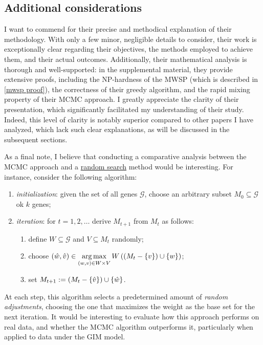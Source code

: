 \subsection{Additional considerations}

I want to commend \textcite{dendrix} for their precise and methodical explanation of their methodology. With only a few minor, negligible details to consider, their work is exceptionally clear regarding their objectives, the methods employed to achieve them, and their actual outcomes. Additionally, their mathematical analysis is thorough and well-supported: in the supplemental material, they provide extensive proofs, including the NP-hardness of the MWSP (which is described in \cref{mwsp proof}), the correctness of their greedy algorithm, and the rapid mixing property of their MCMC approach. I greatly appreciate the clarity of their presentation, which significantly facilitated my understanding of their study. Indeed, this level of clarity is notably superior compared to other papers I have analyzed, which lack such clear explanations, as will be discussed in the subsequent sections.

As a final note, I believe that conducting a comparative analysis between the MCMC approach and a \href{https://en.wikipedia.org/wiki/Random_search}{random search} method would be interesting. For instance, consider the following algorithm:

\begin{enumerate}
    \item \textit{initialization}: given the set of all genes $\mathcal G$, choose an arbitrary subset $M_0 \subseteq \mathcal G$ ok $k$ genes;
    \item \textit{iteration}: for $t = 1, 2, \ldots$ derive $M_{t + 1}$ from $M_t$ as follows:

    \begin{enumerate}
        \item define $W \subseteq \mathcal G$ and $V \subseteq M_t$ randomly;
        \item choose $\displaystyle (\hat w, \hat v) \in \operatorname*{arg\,max}_{(w, v) \in W \times V}{W\left(\left(M_t - \{v\}\right) \cup \{w\}\right)}$;
        \item set $M_{t + 1} := \left(M_t - \{\hat v\}\right) \cup \{\hat w\}$.
    \end{enumerate}
\end{enumerate}

At each step, this algorithm selects a predetermined amount of \textit{random adjustments}, choosing the one that maximizes the weight as the base set for the next iteration. It would be interesting to evaluate how this approach performs on real data, and whether the MCMC algorithm outperforms it, particularly when applied to data under the GIM model.

